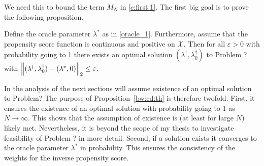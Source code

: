 We need this to bound the term $M_N$ in \eqref{c:first:1}.
The first big goal is to prove the following proposition.
\begin{proposition}
  \label{bw:cd:th}
Define the oracle parameter $\lambda^*$ as in \eqref{oracle_1}.
Furthermore, assume that the propensity score function is continuous and positive on $\mathcal{X}$.
Then for all $\varepsilon>0$ with probability going to 1 there exists an optimal solution
     $(\lambda^\dagger,\lambda_0^\dagger)$
     to Problem ? with
     $
     \left\lVert
       (\lambda^\dagger,\lambda_0^\dagger)
      -
      (\lambda^*,0)
     \right\rVert_2
     \le
     \varepsilon
     $.
\end{proposition}
\begin{remark}
  In the analysis of the next sections will assume existence of an optimal solution to Problem?
  The purpose of Proposition~\ref{bw:cd:th} is therefore twofold. 
  First, it ensures the existence of an optimal solution with probability going to 1 as $N\to\infty$.
  This shows that the assumption of existence is (at least for large $N$) likely met.
  Nevertheless, it is beyond the scope of my thesis to investigate feasibility of Problem ? in more detail. 
  Second, if a solution exists it converges to the oracle parameter $\lambda^*$ in probability. This ensures the consistency of the weights for the inverse propensity score.
\end{remark}


